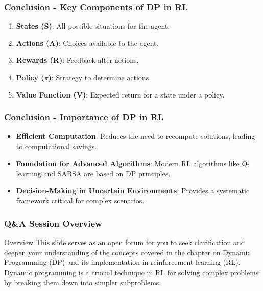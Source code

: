 \documentclass[aspectratio=169]{beamer}
\begin{document}
\begin{frame}[fragile]
    \frametitle{Conclusion - Key Components of DP in RL}
    \begin{enumerate}
        \item \textbf{States (S)}: All possible situations for the agent.
        \item \textbf{Actions (A)}: Choices available to the agent.
        \item \textbf{Rewards (R)}: Feedback after actions.
        \item \textbf{Policy ($\pi$)}: Strategy to determine actions.
        \item \textbf{Value Function (V)}: Expected return for a state under a policy.
    \end{enumerate}
\end{frame}

\begin{frame}[fragile]
    \frametitle{Conclusion - Importance of DP in RL}
    \begin{itemize}
        \item \textbf{Efficient Computation}: Reduces the need to recompute solutions, leading to computational savings.
        \item \textbf{Foundation for Advanced Algorithms}: Modern RL algorithms like Q-learning and SARSA are based on DP principles.
        \item \textbf{Decision-Making in Uncertain Environments}: Provides a systematic framework critical for complex scenarios.
    \end{itemize}
\end{frame}

\begin{frame}
  \frametitle{Q\&A Session Overview}
  \begin{block}{Overview}
    This slide serves as an open forum for you to seek clarification and deepen your understanding of the concepts covered in the chapter on 
    Dynamic Programming (DP) and its implementation in reinforcement learning (RL).
    Dynamic programming is a crucial technique in RL for solving complex problems by breaking them down into simpler subproblems.
  \end{block}
\end{frame}
\end{document}
